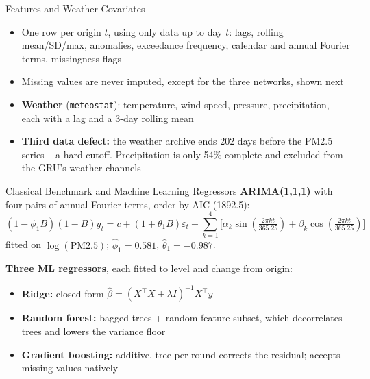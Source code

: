 \documentclass[12pt,aspectratio=169]{beamer}
\begin{document}
\begin{frame}{Features and Weather Covariates}
  \begin{itemize}
    \item One row per origin $t$, using only data up to day $t$: lags,
      rolling mean/SD/max, anomalies, exceedance frequency, calendar and
      annual Fourier terms, missingness flags
    \item Missing values are never imputed, except for the three
      networks, shown next
    \item \textbf{Weather} (\texttt{meteostat}): temperature, wind speed,
      pressure, precipitation, each with a lag and a 3-day rolling mean
    \item \textbf{Third data defect:} the weather archive ends 202 days
      before the PM2.5 series -- a hard cutoff. Precipitation is only
      54\% complete and excluded from the GRU's weather channels
  \end{itemize}
\end{frame}

\begin{frame}{Classical Benchmark and Machine Learning Regressors}
  \textbf{ARIMA(1,1,1)} with four pairs of annual Fourier terms, order by
  AIC (1892.5):
  \[
  (1-\phi_1 B)(1-B)y_t = c + (1+\theta_1 B)\varepsilon_t +
  \sum_{k=1}^{4}\big[\alpha_k\sin(\tfrac{2\pi kt}{365.25}) +
  \beta_k\cos(\tfrac{2\pi kt}{365.25})\big]
  \]
  fitted on $\log(\text{PM2.5})$; $\hat\phi_1=0.581$, $\hat\theta_1=-0.987$.

  \textbf{Three ML regressors}, each fitted to level and change from
  origin:
  \begin{itemize}
    \item \textbf{Ridge:} closed-form $\hat\beta=(X^\top X+\lambda I)^{-1}X^\top y$
    \item \textbf{Random forest:} bagged trees + random feature subset,
      which decorrelates trees and lowers the variance floor
    \item \textbf{Gradient boosting:} additive, tree per round corrects
      the residual; accepts missing values natively
  \end{itemize}
\end{frame}
\end{document}
